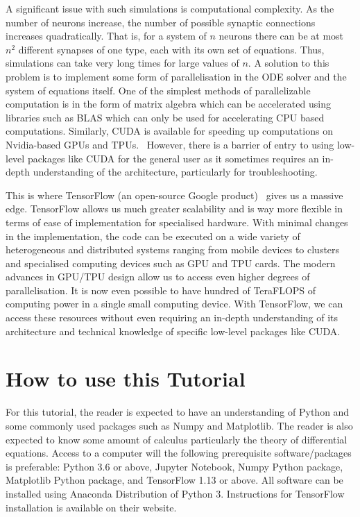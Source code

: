 \documentclass[10pt,letterpaper]{article}
\begin{document}
A significant issue with such simulations is computational complexity. As the number of neurons increase, the number of possible synaptic connections increases quadratically. That is, for a system of $n$ neurons there can be at most $n^2$ different synapses of one type, each with its own set of equations. Thus, simulations can take very long times for large values of $n$. A solution to this problem is to implement some form of parallelisation in the ODE solver and the system of equations itself. One of the simplest methods of parallelizable computation is in the form of matrix algebra which can be accelerated using libraries such as BLAS which can only be used for accelerating CPU based computations. Similarly, CUDA is available for speeding up computations on Nvidia-based GPUs and TPUs.~\cite{} However, there is a barrier of entry to using low-level packages like CUDA for the general user as it sometimes requires an in-depth understanding of the architecture, particularly for troubleshooting.

This is where TensorFlow (an open-source Google product)~\cite{} gives us a massive edge. TensorFlow allows us much greater scalability and is way more flexible in terms of ease of implementation for specialised hardware. With minimal changes in the implementation, the code can be executed on a wide variety of heterogeneous and distributed systems ranging from mobile devices to clusters and specialised computing devices such as GPU and TPU cards. The modern advances in GPU/TPU design allow us to access even higher degrees of parallelisation. It is now even possible to have hundred of TeraFLOPS of computing power in a single small computing device. With TensorFlow, we can access these resources without even requiring an in-depth understanding of its architecture and technical knowledge of specific low-level packages like CUDA.


\section*{How to use this Tutorial}

For this tutorial, the reader is expected to have an understanding of Python and some commonly used packages such as Numpy and Matplotlib. The reader is also expected to know some amount of calculus particularly the theory of differential equations. Access to a computer will the following prerequisite software/packages is preferable: Python 3.6 or above, Jupyter Notebook, Numpy Python package, Matplotlib Python package, and TensorFlow 1.13 or above. All software can be installed using Anaconda Distribution of Python 3. Instructions for TensorFlow installation is available on their website.
\end{document}
